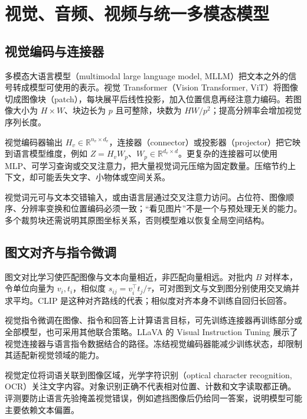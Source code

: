 \setcounter{chapter}{26} %
\chapter{视觉、音频、视频与统一多模态模型}
\label{ch:multimodal}

\section{视觉编码与连接器}

多模态大语言模型（multimodal large language model, MLLM）把文本之外的信号转成模型可使用的表示。视觉 Transformer（Vision Transformer, ViT）将图像切成图像块（patch），每块展平后线性投影，加入位置信息再经注意力编码\cite{vit}。若图像大小为 $H\times W$、块边长为 $p$ 且可整除，块数为 $HW/p^2$；提高分辨率会增加视觉序列长度。

视觉编码器输出 $H_v\in\mathbb R^{n_v\times d_v}$，连接器（connector）或投影器（projector）把它映到语言模型维度，例如 $Z=H_vW_p$、$W_p\in\mathbb R^{d_v\times d}$。更复杂的连接器可以使用 MLP、可学习查询或交叉注意力，把大量视觉词元压缩为固定数量。压缩节约上下文，却可能丢失文字、小物体或空间关系。

视觉词元可与文本交错输入，或由语言层通过交叉注意力访问。占位符、图像顺序、分辨率变换和位置编码必须一致；“看见图片”不是一个与预处理无关的能力。多个裁剪块还需说明其原图坐标关系，否则模型难以恢复全局空间结构。

\section{图文对齐与指令微调}

图文对比学习使匹配图像与文本向量相近，非匹配向量相远。对批内 $B$ 对样本，令单位向量为 $v_i,t_i$，相似度 $s_{ij}=v_i^\top t_j/\tau$，可对图到文与文到图分别使用交叉熵并求平均。CLIP 是这种对齐路线的代表\cite{clip}；相似度对齐本身不训练自回归长回答。

视觉指令微调在图像、指令和回答上计算语言目标，可先训练连接器再训练部分或全部模型，也可采用其他联合策略。LLaVA 的 Visual Instruction Tuning 展示了视觉连接器与语言指令数据结合的路径\cite{llava}。冻结视觉编码器能减少训练状态，却限制其适配新视觉领域的能力。

视觉定位将词语关联到图像区域，光学字符识别（optical character recognition, OCR）关注文字内容。对象识别正确不代表相对位置、计数和文字读取都正确。评测要防止语言先验掩盖视觉错误，例如遮挡图像后仍给同一答案，说明模型可能主要依赖文本偏置。

